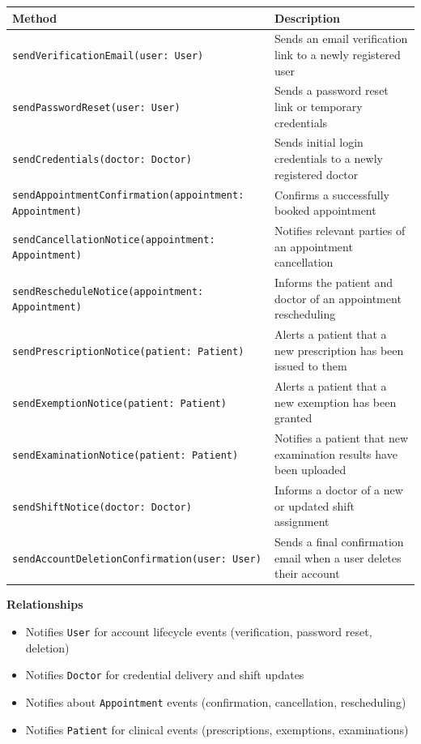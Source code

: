 \documentclass[12pt, a4paper]{article}
\begin{document}
\begin{center}
\small
\renewcommand{\arraystretch}{1.35}
\begin{tabularx}{\textwidth}{|M|Y|}
\hline
{}
\textbf{Method} & \textbf{Description} \\ \hline
\texttt{sendVerificationEmail(user: User)} & Sends an email verification link to a newly registered user \\ \hline
\texttt{sendPasswordReset(user: User)} & Sends a password reset link or temporary credentials \\ \hline
\texttt{sendCredentials(doctor: Doctor)} & Sends initial login credentials to a newly registered doctor \\ \hline
\texttt{sendAppointmentConfirmation(appointment: Appointment)} & Confirms a successfully booked appointment \\ \hline
\texttt{sendCancellationNotice(appointment: Appointment)} & Notifies relevant parties of an appointment cancellation \\ \hline
\texttt{sendRescheduleNotice(appointment: Appointment)} & Informs the patient and doctor of an appointment rescheduling \\ \hline
\texttt{sendPrescriptionNotice(patient: Patient)} & Alerts a patient that a new prescription has been issued to them \\ \hline
\texttt{sendExemptionNotice(patient: Patient)} & Alerts a patient that a new exemption has been granted \\ \hline
\texttt{sendExaminationNotice(patient: Patient)} & Notifies a patient that new examination results have been uploaded \\ \hline
\texttt{sendShiftNotice(doctor: Doctor)} & Informs a doctor of a new or updated shift assignment \\ \hline
\texttt{sendAccountDeletionConfirmation(user: User)} & Sends a final confirmation email when a user deletes their account \\ \hline
\end{tabularx}
\end{center}

\textbf{Relationships}

\begin{itemize}
    \item Notifies \texttt{User} for account lifecycle events (verification, password reset, deletion)
    \item Notifies \texttt{Doctor} for credential delivery and shift updates
    \item Notifies about \texttt{Appointment} events (confirmation, cancellation, rescheduling)
    \item Notifies \texttt{Patient} for clinical events (prescriptions, exemptions, examinations)
\end{itemize}
\end{document}
